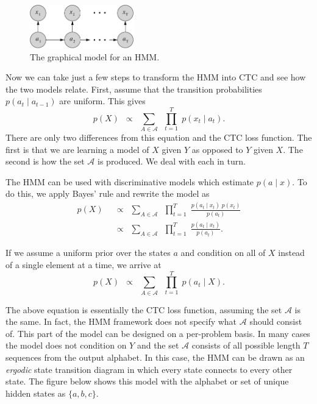 \begin{figure}
\centering
\includegraphics[width=0.4\textwidth]{background/figures/hmm.pdf}
\caption{The graphical model for an HMM.}
\end{figure}

Now we can take just a few steps to transform the HMM into CTC and see how
the two models relate. First, assume that the transition probabilities
$p(a_t \mid a_{t-1})$ are uniform. This gives
\[
p(X) \enspace \propto \enspace \sum_{A \in \mathcal{A}} \enspace \prod_{t=1}^T \; p(x_t \mid a_t).
\]
There are only two differences from this equation and the CTC loss function.
The first is that we are learning a model of $X$ given $Y$ as opposed to $Y$
given $X$. The second is how the set $\mathcal{A}$ is produced. We deal with
each in turn.

The HMM can be used with discriminative models which estimate $p(a \mid x)$.
To do this, we apply Bayes’ rule and rewrite the model as
\begin{align*}
p(X) \enspace &\propto \enspace \sum_{A \in \mathcal{A}} \enspace \prod_{t=1}^T \; \frac{p(a_t \mid x_t)\; p(x_t)}{p(a_t)} \\
    &\propto \enspace \sum_{A \in \mathcal{A}} \enspace \prod_{t=1}^T \; \frac{p(a_t \mid x_t)}{p(a_t)}.
\end{align*}

If we assume a uniform prior over the states $a$ and condition on all of $X$
instead of a single element at a time, we arrive at
\[
p(X) \enspace \propto \enspace \sum_{A \in \mathcal{A}} \enspace \prod_{t=1}^T \; p(a_t \mid X).
\]

The above equation is essentially the CTC loss function, assuming the set
$\mathcal{A}$ is the same. In fact, the HMM framework does not specify what
$\mathcal{A}$ should consist of. This part of the model can be designed on a
per-problem basis. In many cases the model does not condition on $Y$ and the
set $\mathcal{A}$ consists of all possible length $T$ sequences from the output
alphabet. In this case, the HMM can be drawn as an  {\it ergodic} state
transition diagram in which every state connects to every other state. The
figure below shows this model with the alphabet or set of unique hidden states
as $\{a, b, c\}$.

